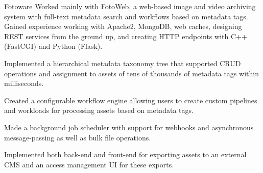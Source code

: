 \begin{experience}[last]{Fotoware}{
}
Worked mainly with FotoWeb, a web-based image and video
archiving system with full-text metadata search and workflows based on
metadata tags. Gained experience working with Apache2, MongoDB, web
caches, designing REST services from the ground up, and creating HTTP endpoints with C++ (FastCGI)
and Python (Flask).

\begin{contribs}
	\item{Implemented a hierarchical metadata taxonomy tree that
		supported CRUD operations and assignment to assets of tens of thousands of metadata tags within
		milliseconds.}
	\item{Created a configurable workflow engine allowing users to
		create custom pipelines and workloads for processing assets based on
		metadata tags.}
	\item{Made a background job scheduler with support for
		webhooks and asynchronous message-passing as well as
		bulk file operations.}
	\item{Implemented both back-end and front-end for exporting
		assets to an external CMS and an access 
		management UI for these exports.}
\end{contribs}
\end{experience}


